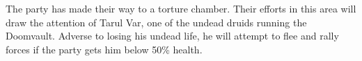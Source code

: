 The party has made their way to a torture chamber.
Their efforts in this area will draw the attention of Tarul Var, one of the undead druids running the Doomvault.
Adverse to losing his undead life, he will attempt to flee and rally forces if the party gets him below 50\% health.
